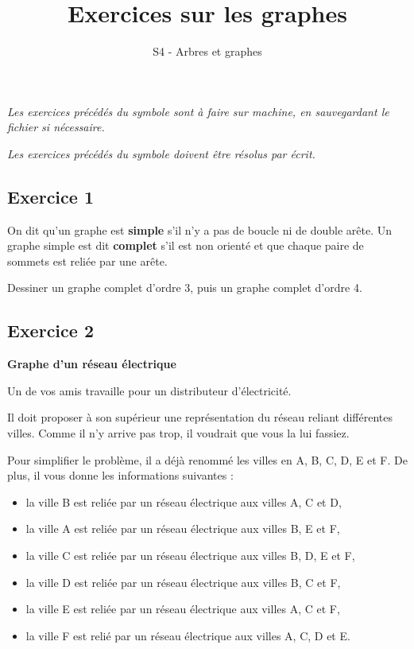 \documentclass[
  letterpaper,
  DIV=11,
  numbers=noendperiod]{scrartcl}
\title{Exercices sur les graphes}
\subtitle{S4 - Arbres et graphes}
\author{}
\date{}
\providecommand{\tightlist}{%
  \setlength{\itemsep}{0pt}\setlength{\parskip}{0pt}}\usepackage{longtable,booktabs,array}
\begin{document}
\maketitle
\ifdefined\Shaded\renewenvironment{Shaded}{\begin{tcolorbox}[enhanced, borderline west={3pt}{0pt}{shadecolor}, boxrule=0pt, interior hidden, breakable, frame hidden, sharp corners]}{\end{tcolorbox}}\fi

\emph{Les exercices précédés du symbole  sont à faire
sur machine, en sauvegardant le fichier si nécessaire.}

\emph{Les exercices précédés du symbole  doivent être
résolus par écrit.}

\hypertarget{fa-solid-pencil-alt-exercice-1}{%
\subsection{\texorpdfstring{ Exercice
1}{ Exercice 1}}\label{fa-solid-pencil-alt-exercice-1}}

On dit qu'un graphe est \textbf{simple} s'il n'y a pas de boucle ni de
double arête. Un graphe simple est dit \textbf{complet} s'il est non
orienté et que chaque paire de sommets est reliée par une arête.

Dessiner un graphe complet d'ordre 3, puis un graphe complet d'ordre 4.

\hypertarget{fa-solid-pencil-alt-exercice-2}{%
\subsection{\texorpdfstring{ Exercice
2}{ Exercice 2}}\label{fa-solid-pencil-alt-exercice-2}}

\textbf{Graphe d'un réseau électrique}

Un de vos amis travaille pour un distributeur d'électricité.

Il doit proposer à son supérieur une représentation du réseau reliant
différentes villes. Comme il n'y arrive pas trop, il voudrait que vous
la lui fassiez.

Pour simplifier le problème, il a déjà renommé les villes en A, B, C, D,
E et F. De plus, il vous donne les informations suivantes :

\begin{itemize}
\tightlist
\item
  la ville B est reliée par un réseau électrique aux villes A, C et D,
\item
  la ville A est reliée par un réseau électrique aux villes B, E et F,
\item
  la ville C est reliée par un réseau électrique aux villes B, D, E et
  F,
\item
  la ville D est reliée par un réseau électrique aux villes B, C et F,
\item
  la ville E est reliée par un réseau électrique aux villes A, C et F,
\item
  la ville F est relié par un réseau électrique aux villes A, C, D et E.
\end{itemize}
\end{document}
